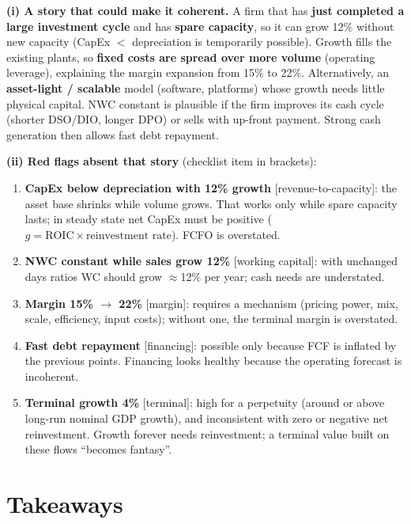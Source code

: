 \begin{exbox}
\textbf{(i) A story that could make it coherent.} A firm that has \textbf{just completed a large investment cycle} and has \textbf{spare capacity}, so it can grow 12\% without new capacity (CapEx $<$ depreciation is temporarily possible). Growth fills the existing plants, so \textbf{fixed costs are spread over more volume} (operating leverage), explaining the margin expansion from 15\% to 22\%. Alternatively, an \textbf{asset-light / scalable} model (software, platforms) whose growth needs little physical capital. NWC constant is plausible if the firm improves its cash cycle (shorter DSO/DIO, longer DPO) or sells with up-front payment. Strong cash generation then allows fast debt repayment.

\textbf{(ii) Red flags absent that story} (checklist item in brackets):
\begin{enumerate}[leftmargin=*]
  \item \textbf{CapEx below depreciation with 12\% growth} [revenue-to-capacity]: the asset base shrinks while volume grows. That works only while spare capacity lasts; in steady state net CapEx must be positive ($g=\text{ROIC}\times\text{reinvestment rate}$). FCFO is overstated.
  \item \textbf{NWC constant while sales grow 12\%} [working capital]: with unchanged days ratios WC should grow $\approx$12\% per year; cash needs are understated.
  \item \textbf{Margin 15\% $\to$ 22\%} [margin]: requires a mechanism (pricing power, mix, scale, efficiency, input costs); without one, the terminal margin is overstated.
  \item \textbf{Fast debt repayment} [financing]: possible only because FCF is inflated by the previous points. Financing looks healthy because the operating forecast is incoherent.
  \item \textbf{Terminal growth 4\%} [terminal]: high for a perpetuity (around or above long-run nominal GDP growth), and inconsistent with zero or negative net reinvestment. Growth forever needs reinvestment; a terminal value built on these flows ``becomes fantasy''.
\end{enumerate}
\end{exbox}

\section{Takeaways}

